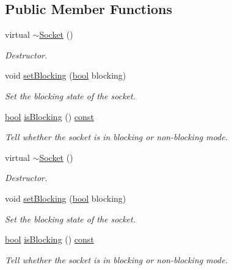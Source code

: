 \subsection*{Public Member Functions}
\begin{DoxyCompactItemize}
\item 
virtual \hyperlink{classsf_1_1_socket_a79a4b5918f0b34a2f8db449089694788}{$\sim$\-Socket} ()
\begin{DoxyCompactList}\small\item\em Destructor. \end{DoxyCompactList}\item 
void \hyperlink{classsf_1_1_socket_a165fc1423e281ea2714c70303d3a9782}{set\-Blocking} (\hyperlink{term__entry_8h_a002004ba5d663f149f6c38064926abac}{bool} blocking)
\begin{DoxyCompactList}\small\item\em Set the blocking state of the socket. \end{DoxyCompactList}\item 
\hyperlink{term__entry_8h_a002004ba5d663f149f6c38064926abac}{bool} \hyperlink{classsf_1_1_socket_a0ec0d831b015e32eb5935fd2a9f8c67c}{is\-Blocking} () \hyperlink{term__entry_8h_a57bd63ce7f9a353488880e3de6692d5a}{const} 
\begin{DoxyCompactList}\small\item\em Tell whether the socket is in blocking or non-\/blocking mode. \end{DoxyCompactList}\item 
virtual \hyperlink{classsf_1_1_socket_a79a4b5918f0b34a2f8db449089694788}{$\sim$\-Socket} ()
\begin{DoxyCompactList}\small\item\em Destructor. \end{DoxyCompactList}\item 
void \hyperlink{classsf_1_1_socket_a165fc1423e281ea2714c70303d3a9782}{set\-Blocking} (\hyperlink{term__entry_8h_a002004ba5d663f149f6c38064926abac}{bool} blocking)
\begin{DoxyCompactList}\small\item\em Set the blocking state of the socket. \end{DoxyCompactList}\item 
\hyperlink{term__entry_8h_a002004ba5d663f149f6c38064926abac}{bool} \hyperlink{classsf_1_1_socket_a0ec0d831b015e32eb5935fd2a9f8c67c}{is\-Blocking} () \hyperlink{term__entry_8h_a57bd63ce7f9a353488880e3de6692d5a}{const} 
\begin{DoxyCompactList}\small\item\em Tell whether the socket is in blocking or non-\/blocking mode. \end{DoxyCompactList}\end{DoxyCompactItemize}
